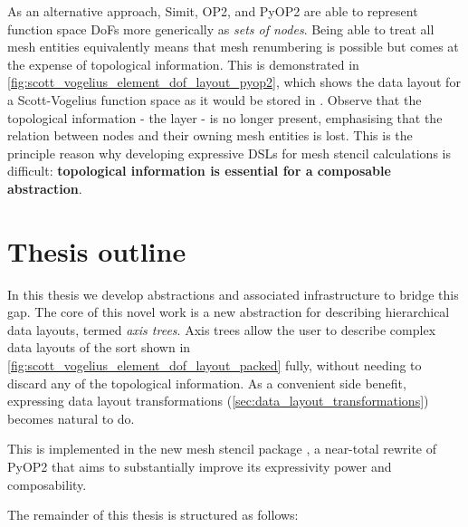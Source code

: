 \documentclass[thesis]{subfiles}
\begin{document}
As an alternative approach, Simit, OP2, and PyOP2 are able to represent function space DoFs more generically as \textit{sets of nodes}.
Being able to treat all mesh entities equivalently means that mesh renumbering is possible but comes at the expense of topological information.
This is demonstrated in \cref{fig:scott_vogelius_element_dof_layout_pyop2}, which shows the data layout for a Scott-Vogelius function space as it would be stored in .
Observe that the topological information - the  layer - is no longer present, emphasising that the relation between nodes and their owning mesh entities is lost.
This is the principle reason why developing expressive DSLs for mesh stencil calculations is difficult: \textbf{topological information is essential for a composable abstraction}.



\section{Thesis outline}

In this thesis we develop abstractions and associated infrastructure to bridge this gap.
The core of this novel work is a new abstraction for describing hierarchical data layouts, termed \textit{axis trees}.
Axis trees allow the user to describe complex data layouts of the sort shown in \cref{fig:scott_vogelius_element_dof_layout_packed} fully, without needing to discard any of the topological information.
As a convenient side benefit, expressing data layout transformations (\cref{sec:data_layout_transformations}) becomes natural to do.

This is implemented in the new mesh stencil package , a near-total rewrite of PyOP2 that aims to substantially improve its expressivity power and composability.

The remainder of this thesis is structured as follows:
\end{document}
